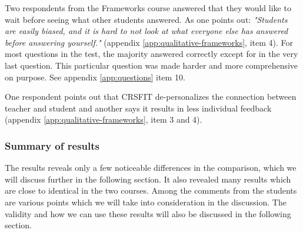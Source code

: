 Two respondents from the Frameworks course answered that they would like to wait before seeing what other students answered. As one points out: \emph{"Students are easily biased, and it is hard to not look at what everyone else has answered before answering yourself."} (appendix \ref{app:qualitative-frameworks}, item 4). For most questions in the test, the majority answered correctly except for in the very last question. This particular question was made harder and more comprehensive on purpose. See appendix \ref{app:questions} item 10. 

One respondent points out that CRSFIT de-personalizes the connection between teacher and student and another says it results in less individual feedback (appendix \ref{app:qualitative-frameworks}, item 3 and 4). 


\subsubsection*{Summary of results}
The results reveals only a few noticeable differences in the comparison, which we will discuss further in the following section. It also revealed many results which are close to identical in the two courses. Among the comments from the students are various points which we will take into consideration in the discussion. The validity and how we can use these results will also be discussed in the following section.
